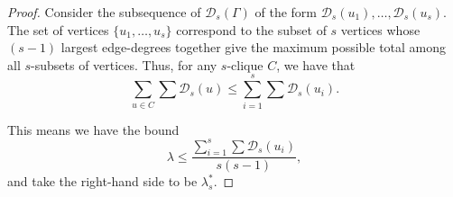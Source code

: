 \documentclass[10pt,a4paper]{amsart}
\renewcommand\le{\leqslant}
\begin{document}
	\begin{proof}
	Consider the subsequence of $\mathcal{D}_s(\Gamma)$ of the form $\mathcal{D}_s(u_{1}), \dots, \mathcal{D}_s(u_s)$.  
The set of vertices $\{u_{1}, \dots, u_s\}$ correspond to the subset of $s$ vertices whose $(s-1)$ largest edge-degrees together give the maximum possible total among all $s$-subsets of vertices. Thus, for any $s$-clique $C$, we have that 
    \[  
    \sum_{u\in C}\sum \mathcal{D}_s(u)  
    \le  
    \sum_{i=1}^s\sum \mathcal{D}_s(u_i).  
    \]
    
    This means we have the bound
\[
  \lambda \le 
  \frac{\sum_{i=1}^{s} \sum \mathcal{D}_s(u_i)}{s(s-1)},
\]
and take the right-hand side to be $\lambda^*_s$.
	\end{proof}
\end{document}
